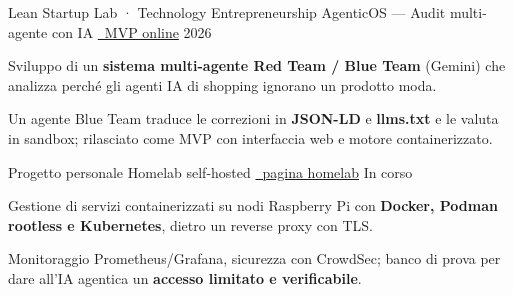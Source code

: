 \documentclass[11pt, a4paper]{../awesome-cv}
\begin{document}
\begin{cventries}
  \cventry
    {Lean Startup Lab · Technology Entrepreneurship}
    {AgenticOS — Audit multi-agente con IA}
    {\href{https://agenticos-mvp.netlify.app}{\faGlobe\ MVP online}}
    {2026}
    {
      \begin{cvitems}
        \item {Sviluppo di un \textbf{sistema multi-agente Red Team / Blue Team} (Gemini) che analizza perché gli agenti IA di shopping ignorano un prodotto moda.}
        \item {Un agente Blue Team traduce le correzioni in \textbf{JSON-LD} e \textbf{llms.txt} e le valuta in sandbox; rilasciato come MVP con interfaccia web e motore containerizzato.}
      \end{cvitems}
    }

  \cventry
    {Progetto personale}
    {Homelab self-hosted}
    {\href{https://mattia-giovannini.github.io/homelab/}{\faGlobe\ pagina homelab}}
    {In corso}
    {
      \begin{cvitems}
        \item {Gestione di servizi containerizzati su nodi Raspberry Pi con \textbf{Docker, Podman rootless e Kubernetes}, dietro un reverse proxy con TLS.}
        \item {Monitoraggio Prometheus/Grafana, sicurezza con CrowdSec; banco di prova per dare all'IA agentica un \textbf{accesso limitato e verificabile}.}
      \end{cvitems}
    }
\end{cventries}

\begin{cvskills}
\end{cvskills}

\begin{cvskills}
\end{cvskills}
\end{document}
